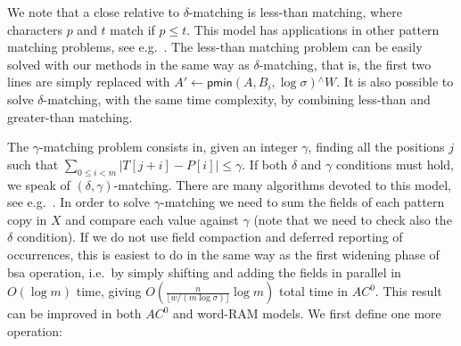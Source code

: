 \documentclass{llncs}
\newcommand{\floor}[1]{\lfloor #1 \rfloor}
\newcommand{\uxor}{\mathrel{^\wedge}}
\newcommand{\word}[1]{#1}
\begin{document}
We note that a close relative to $\delta$-matching is less-than matching, where characters
$p$ and $t$ match if $p \leq t$.
This model has applications in other pattern matching problems, see e.g.\
\cite{DBLP:conf/focs/AmirALLL97}.
The less-than matching problem can be easily solved with our methods in the same way as
$\delta$-matching, that is,
the first two lines are simply replaced with
$A' \leftarrow \textsf{pmin}(A, B_i, \log\sigma) \uxor \word{W}$. It is also possible to solve
$\delta$-matching, with the same time complexity, by combining less-than and greater-than matching.

The $\gamma$-matching problem consists in, given an integer
$\gamma$, finding all the positions $j$ such that $\sum_{0 \leq i < m}
|T[j + i] - P[i]| \le \gamma$. If both $\delta$ and $\gamma$
conditions must hold, we speak of $(\delta,\gamma)$-matching. There
are many algorithms devoted to this model, see
e.g.\ \cite{CINPSjda04}. In order to solve $\gamma$-matching
we need to sum the fields of each pattern copy in $\word{X}$ and
compare each value against $\gamma$ (note that we need to check also
the $\delta$ condition). If we do not use field compaction and
deferred reporting of occurrences, this is easiest to do in the same
way as the first widening phase of \textsf{bsa} operation, i.e.\ by
simply shifting and adding the fields in parallel in
$O(\log m)$
time, giving
$O(\frac{n}{\floor{w/(m\log\sigma)}} \log m)$
total time in $AC^0$.
This result can be improved in both $AC^0$ and word-RAM models.
We first define one more operation:
\end{document}
